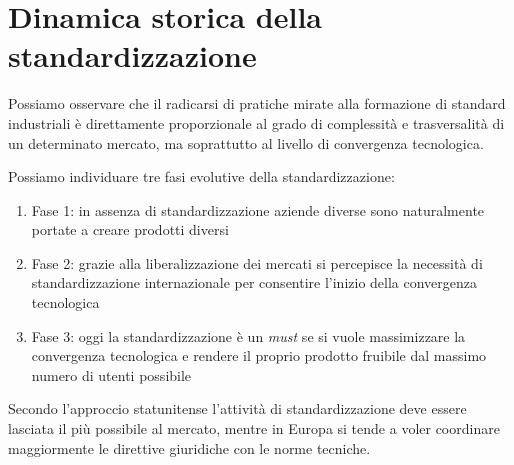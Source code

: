 \section{Dinamica storica della standardizzazione}

Possiamo osservare che il radicarsi di pratiche mirate alla formazione di standard industriali è direttamente proporzionale al grado di complessità e trasversalità di un determinato mercato, ma soprattutto al livello di convergenza tecnologica.

Possiamo individuare tre fasi evolutive della standardizzazione:
\begin{enumerate}
    \item Fase 1: in assenza di standardizzazione aziende diverse sono naturalmente portate a creare prodotti diversi 
    \item Fase 2: grazie alla liberalizzazione dei mercati si percepisce la necessità di standardizzazione internazionale per consentire l'inizio della convergenza tecnologica
    \item Fase 3: oggi la standardizzazione è un \textit{must} se si vuole massimizzare la convergenza tecnologica e rendere il proprio prodotto fruibile dal massimo numero di utenti possibile
\end{enumerate}


Secondo l'approccio statunitense l'attività di standardizzazione deve essere lasciata il più possibile al mercato, mentre in Europa si tende a voler coordinare maggiormente le direttive giuridiche con le norme tecniche.